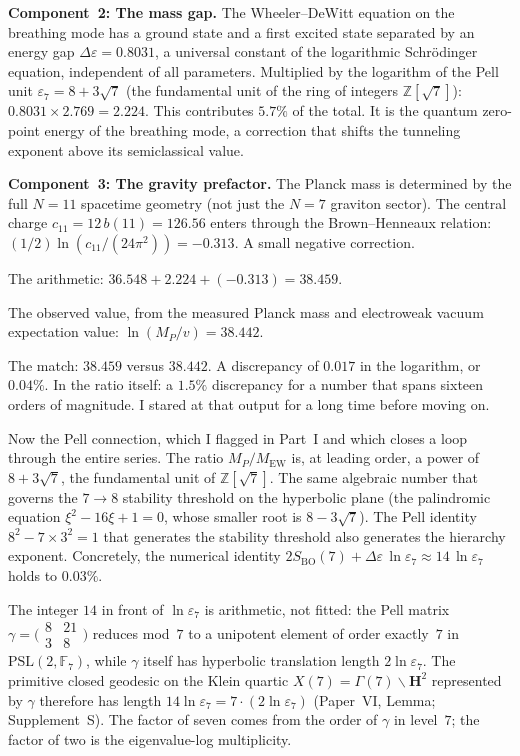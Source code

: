 \textbf{Component~2: The mass gap.} The Wheeler--DeWitt equation on
the breathing mode has a ground state and a first excited state
separated by an energy gap $\Delta\varepsilon = 0.8031$, a universal
constant of the logarithmic Schr\"odinger equation, independent of
all parameters. Multiplied by the logarithm of the Pell unit
$\varepsilon_7 = 8 + 3\sqrt{7}$ (the fundamental unit of the ring of
integers $\mathbb{Z}[\sqrt{7}]$): $0.8031 \times 2.769 = 2.224$.
This contributes $5.7\%$ of the total. It is the quantum zero-point
energy of the breathing mode, a correction that shifts the tunneling
exponent above its semiclassical value.

\textbf{Component~3: The gravity prefactor.} The Planck mass is
determined by the full $N = 11$ spacetime geometry (not just the
$N = 7$ graviton sector). The central charge $c_{11} = 12\,b(11) =
126.56$ enters through the Brown--Henneaux relation:
$(1/2)\ln(c_{11}/(24\pi^2)) = -0.313$. A small negative correction.

The arithmetic: $36.548 + 2.224 + (-0.313) = 38.459$.

The observed value, from the measured Planck mass and electroweak
vacuum expectation value: $\ln(M_P/v) = 38.442$.

The match: $38.459$ versus $38.442$. A discrepancy of $0.017$ in the
logarithm, or $0.04\%$. In the ratio itself: a $1.5\%$ discrepancy
for a number that spans sixteen orders of magnitude. I stared at that
output for a long time before moving on.

Now the Pell connection, which I flagged in Part~I and which closes a
loop through the entire series. The ratio $M_P/M_{\mathrm{EW}}$ is,
at leading order, a power of $8 + 3\sqrt{7}$, the fundamental unit
of $\mathbb{Z}[\sqrt{7}]$. The same algebraic number that governs
the $7 \to 8$ stability threshold on the hyperbolic plane (the
palindromic equation $\xi^2 - 16\xi + 1 = 0$, whose smaller root
is $8 - 3\sqrt{7}$). The Pell identity
$8^2 - 7 \times 3^2 = 1$ that generates the stability threshold also
generates the hierarchy exponent. Concretely, the numerical identity
$2S_{\mathrm{BO}}(7) + \Delta\varepsilon\,\ln\varepsilon_7
\approx 14\,\ln\varepsilon_7$ holds to $0.03\%$.

The integer $14$ in front of $\ln\varepsilon_7$ is arithmetic, not
fitted: the Pell matrix
$\gamma = \bigl(\begin{smallmatrix} 8 & 21 \\ 3 & 8 \end{smallmatrix}\bigr)$
reduces mod~$7$ to a unipotent element of order exactly~$7$ in
$\mathrm{PSL}(2,\mathbb{F}_7)$, while $\gamma$ itself has hyperbolic
translation length $2\ln\varepsilon_7$. The primitive closed geodesic
on the Klein quartic $X(7) = \Gamma(7)\backslash\mathbf{H}^2$
represented by $\gamma$ therefore has length $14\ln\varepsilon_7
= 7 \cdot (2\ln\varepsilon_7)$ (Paper~VI, Lemma; Supplement~S).
The factor of seven comes from the order of $\gamma$ in level~$7$;
the factor of two is the eigenvalue-log multiplicity.


